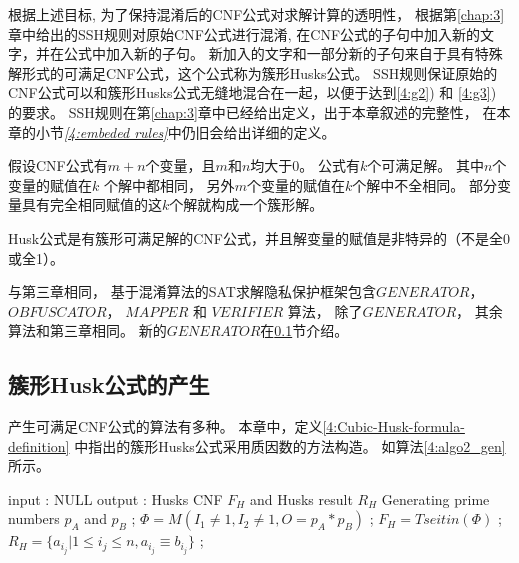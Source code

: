 根据上述目标,
为了保持混淆后的CNF公式对求解计算的透明性，
根据第\ref{chap:3}章中给出的SSH规则对原始CNF公式进行混淆,
在CNF公式的子句中加入新的文字，并在公式中加入新的子句。
新加入的文字和一部分新的子句来自于具有特殊解形式的可满足CNF公式，这个公式称为簇形Husks公式。
SSH规则保证原始的CNF公式可以和簇形Husks公式无缝地混合在一起，以便于达到\ref{4:g2}) 和 \ref{4:g3}) 的要求。
SSH规则在第\ref{chap:3}章中已经给出定义，出于本章叙述的完整性，
在本章的小节\textit{\ref{4:embeded rules}}中仍旧会给出详细的定义。

\begin{definition}[簇形解]\label{4:Cubic-Husk-Solution-definition}
假设CNF公式有$m+n$个变量，且$m$和$n$均大于0。
公式有$k$个可满足解。
其中$n$个变量的赋值在$k$ 个解中都相同，
另外$m$个变量的赋值在$k$个解中不全相同。
部分变量具有完全相同赋值的这$k$个解就构成一个簇形解。
\end{definition}

\begin{definition}[簇形Husks 公式]\label{4:Cubic-Husk-formula-definition}
Husk公式是有簇形可满足解的CNF公式，并且解变量的赋值是非特异的（不是全0或全1）。
\end{definition}


与第三章相同，
基于混淆算法的SAT求解隐私保护框架包含$GENERATOR$， $OBFUSCATOR$， $MAPPER$ 和 $VERIFIER$ 算法，
除了$GENERATOR$，
其余算法和第三章相同。
新的$GENERATOR$在\ref{4:genhusk}节介绍。

\subsection{簇形Husk公式的产生}\label{4:genhusk}
产生可满足CNF公式的算法有多种。
本章中，定义\ref{4:Cubic-Husk-formula-definition} 中指出的簇形Husks公式采用质因数的方法构造。
如算法\ref{4:algo2_gen}所示。


\begin{algorithm*}[b]
\caption{$GENERATOR$}
\label{4:algo2_gen}
\begin{algorithmic}[1]
\STATE input : NULL
\STATE output : Husks CNF $F_H$ and Husks result $R_H$
\STATE Generating prime numbers $p_A$ and $p_B$  ; \label{4:primenumber}
\STATE $\Phi= M(I_1 \neq 1, I_2\neq 1, O=p_A*p_B)$ ;\label{4:multiplePrime}
\STATE $F_H=Tseitin(\Phi)$ ;\label{4:TseitinPHI}
\STATE $R_H=\{a_{i_j}|1\le i_j\le n,a_{i_j}\equiv b_{i_j}\}$ ;
\end{algorithmic}
\end{algorithm*}

